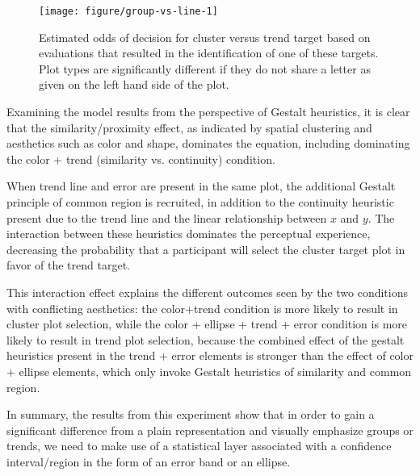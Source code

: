 \documentclass[12pt]{article}\usepackage[]{graphicx}\usepackage[]{color}
\newenvironment{knitrout}{}{} %
\begin{document}
\begin{figure}[h!bt]\centering
\begin{knitrout}
\color{fgcolor}

{\centering \texttt{[image: figure/group-vs-line-1]} 

}



\end{knitrout}
\caption[Estimated odds of decision for cluster versus trend target]{\label{fig:faceoff} Estimated odds of decision for cluster versus trend target based on evaluations that resulted in the identification of one of these targets. Plot types are significantly different if they do not share a letter as given on the left hand side of the plot.}
\end{figure}

Examining the model results from the perspective of Gestalt heuristics, it is clear that the similarity/proximity effect, as indicated by spatial clustering and aesthetics such as color and shape, dominates the equation, including dominating the color + trend (similarity vs. continuity) condition. 

When trend line and error are present in the same plot, the additional Gestalt principle of common region is recruited, in addition to the continuity heuristic present due to the trend line and the linear relationship between $x$ and $y$. The interaction between these heuristics dominates the perceptual experience, decreasing the probability that a participant will select the cluster target plot in favor of the trend target. 

This interaction effect explains the different outcomes seen by the two conditions with conflicting aesthetics: the color+trend condition is more likely to result in cluster plot selection, while the color + ellipse + trend + error condition is more likely to result in trend plot selection, because the combined effect of the gestalt heuristics present in the trend + error elements is stronger than the effect of color + ellipse elements, which only invoke Gestalt heuristics of similarity and common region. 

In summary, the results from this experiment show that in order to gain a significant difference from a plain representation and visually emphasize groups or trends, we need to make use of a statistical layer associated with a confidence interval/region in the form of an error band or an ellipse.
\end{document}
